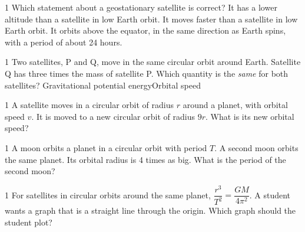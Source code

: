 \begin{practiceq}{1}{}
Which statement about a geostationary satellite is correct?
  {It has a lower altitude than a satellite in low Earth orbit.}
  {It moves faster than a satellite in low Earth orbit.}
  {It orbits above the equator, in the same direction as Earth spins, with a period of about
   24 hours.}
\end{practiceq}

\begin{practiceq}{1}{}
Two satellites, P and Q, move in the same circular orbit around Earth. Satellite Q has three
times the mass of satellite P. Which quantity is the \emph{same} for both satellites?
  {Gravitational potential energy}{Orbital speed}
\end{practiceq}

\begin{practiceq}{1}{}
A satellite moves in a circular orbit of radius $r$ around a planet, with orbital speed $v$. It is
moved to a new circular orbit of radius $9r$. What is its new orbital speed?
\end{practiceq}

\begin{practiceq}{1}{}
A moon orbits a planet in a circular orbit with period $T$. A second moon orbits the same planet.
Its orbital radius is 4 times as big. What is the period of the second moon?
\end{practiceq}

\begin{practiceq}{1}{}
For satellites in circular orbits around the same planet, $\dfrac{r^3}{T^2} = \dfrac{GM}{4\pi^2}$.
A student wants a graph that is a straight line through the origin. Which graph should the student
plot?
\end{practiceq}

